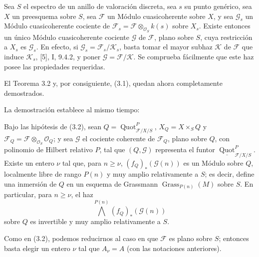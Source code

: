  Sea $S$ el espectro de un anillo de valoración discreta,
sea $s$ su punto genérico, sea $X$ un preesquema sobre $S$, sea $\mathcal F$
un Módulo cuasicoherente sobre $X$, y sea $\mathcal G_s$ un Módulo
cuasicoherente cociente de
$\mathcal F_s=\mathcal F\otimes_{\mathcal O_S}k(s)$ sobre $X_s$. Existe
entonces un único Módulo cuasicoherente cociente $\mathcal G$ de $\mathcal F$,
plano sobre $S$, cuya restricción a $X_s$ es $\mathcal G_s$.
En efecto, si $\mathcal G_s=\mathcal F_s/\mathcal K_s$, basta tomar el mayor
subhaz $\mathcal K$ de $\mathcal F$ que induce $\mathcal K_s$, [5], I, 9.4.2,
y poner $\mathcal G=\mathcal F/\mathcal K$. Se comprueba fácilmente que este
haz posee las propiedades requeridas.

El Teorema 3.2 y, por consiguiente, (3.1), quedan ahora completamente
demostrados.

La demostración establece al mismo tiempo:

 Bajo las hipótesis de (3.2), sean
$Q=\operatorname{Quot}^P_{\mathcal F/X/S}$, $X_Q=X\times_SQ$ y
$\mathcal F_Q=\mathcal F\otimes_{\mathcal O_S}\mathcal O_Q$; y sea
$\mathcal G$ el cociente coherente de $\mathcal F_Q$, plano sobre $Q$, con
polinomio de Hilbert relativo $P$, tal que $(Q,\mathcal G)$ representa el
funtor $\underline{\operatorname{Quot}}^P_{\mathcal F/X/S}$. Existe un entero
$\nu$ tal que, para $n\geq\nu$, $(f_Q)_*(\mathcal G(n))$ es un Módulo sobre
$Q$, localmente libre de rango $P(n)$ y muy amplio relativamente a $S$; es
decir, define una inmersión de $Q$ en un esquema de Grassmann
$\operatorname{Grass}_{P(n)}(M)$ sobre $S$. En particular, para $n\geq\nu$,
el haz
\[
\bigwedge^{P(n)}(f_Q)_*(\mathcal G(n))
\]
sobre $Q$ es invertible y muy amplio relativamente a $S$.

Como en (3.2), podemos reducirnos al caso en que $\mathcal F$ es plano sobre
$S$; entonces basta elegir un entero $\nu$ tal que $A_\nu=A$ (con las
notaciones anteriores).

